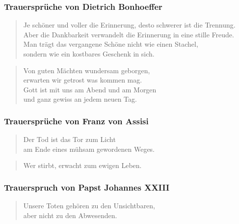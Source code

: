 \documentclass[ngerman,a4paper,11pt]{scrreprt}
\begin{document}
\subsubsection*{Trauersprüche von Dietrich Bonhoeffer}
\label{sec-2-1-2-2-2}

\begin{verse}
Je schöner und voller die Erinnerung, desto schwerer ist die Trennung. \\
Aber die Dankbarkeit verwandelt die Erinnerung in eine stille Freude. \\
Man trägt das vergangene Schöne nicht wie einen Stachel, \\
sondern wie ein kostbares Geschenk in sich. \\
\end{verse}

\begin{verse}
Von guten Mächten wundersam geborgen, \\
erwarten wir getrost was kommen mag. \\
Gott ist mit uns am Abend und am Morgen \\
und ganz gewiss an jedem neuen Tag. \\
\end{verse}

\subsubsection*{Trauersprüche von Franz von Assisi}
\label{sec-2-1-2-2-3}

\begin{verse}
Der Tod ist das Tor zum Licht \\
am Ende eines mühsam gewordenen Weges. \\
\end{verse}

\begin{verse}
Wer stirbt, erwacht zum ewigen Leben. \\
\end{verse}

\subsubsection*{Trauerspruch von Papst Johannes XXIII}
\label{sec-2-1-2-2-4}

\begin{verse}
Unsere Toten gehören zu den Unsichtbaren, \\
aber nicht zu den Abwesenden. \\
\end{verse}
\end{document}
